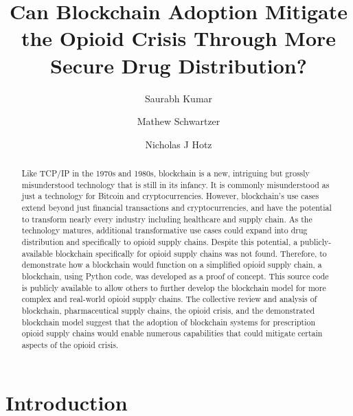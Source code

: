 \documentclass[sigconf]{acmart}
\begin{document}
\title{Can Blockchain Adoption Mitigate the Opioid Crisis Through More Secure Drug Distribution?}


\author{Saurabh Kumar}

\author{Mathew Schwartzer}

\author{Nicholas J Hotz}

\begin{abstract}
Like TCP/IP in the 1970s and 1980s, blockchain is a new, intriguing but grossly misunderstood technology that is still in its infancy. It is commonly misunderstood as just a technology for Bitcoin and cryptocurrencies. However, blockchain's use cases extend beyond just financial transactions and cryptocurrencies, and have the potential to transform nearly every industry including healthcare and supply chain. As the technology matures, additional transformative use cases could expand into drug distribution and specifically to opioid supply chains. Despite this potential, a publicly-available blockchain specifically for opioid supply chains was not found. Therefore, to demonstrate how a blockchain would function on a simplified opioid supply chain, a blockchain, using Python code, was developed as a proof of concept. This source code is publicly available to allow others to further develop the blockchain model for more complex and real-world opioid supply chains. The collective review and analysis of blockchain, pharmaceutical supply chains, the opioid crisis, and the demonstrated blockchain model suggest that the adoption of blockchain systems for prescription opioid supply chains would enable numerous capabilities that could mitigate certain aspects of the opioid crisis.
\end{abstract}


\maketitle

\section{Introduction}
\end{document}
